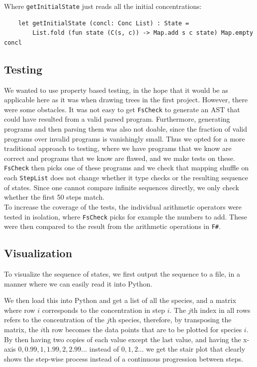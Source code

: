 Where \texttt{getInitialState} just reads all the initial concentrations:
\begin{verbatim}
    let getInitialState (concl: Conc List) : State =
        List.fold (fun state (C(s, c)) -> Map.add s c state) Map.empty concl
\end{verbatim}

\subsection{Testing}
We wanted to use property based testing, in the hope that it would be as applicable here as it was when drawing trees in the first project. However, there were some obstacles. It was not easy to get \texttt{FsCheck} to generate an AST that could have resulted from a valid parsed program. Furthermore, generating programs and then parsing them was also not doable, since the fraction of valid programs over invalid programs is vanishingly small. Thus we opted for a more traditional approach to testing, where we have programs that we know are correct and programs that we know are flawed, and we make tests on these. \texttt{FsCheck} then picks one of these programs and we check that mapping shuffle on each \texttt{StepList} does not change whether it type checks or the resulting sequence of states. Since one cannot compare infinite sequences directly, we only check whether the first 50 steps match.\\

To increase the coverage of the tests, the individual arithmetic operators were tested in isolation, where \texttt{FsCheck} picks for example the numbers to add. These were then compared to the result from the arithmetic operations in \texttt{F\#}.

\subsection{Visualization}
To visualize the sequence of states, we first output the sequence to a file, in a manner where we can easily read it into Python.

We then load this into Python and get a list of all the species, and a matrix where row $i$ corresponds to the concentration in step $i$. The $j$th index in all rows refers to the concentration of the $j$th species, therefore, by transposing the matrix, the $i$th row becomes the data points that are to be plotted for species $i$. By then having two copies of each value except the last value, and having the x-axis $0,0.99,1,1.99,2,2.99\dots$ instead of $0,1,2\dots$ we get the stair plot that clearly shows the step-wise process instead of a continuous progression between steps.

